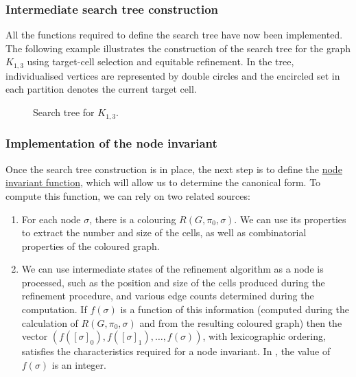 \subsubsection{Intermediate search tree construction}

All the functions required to define the search tree have now been implemented. The following example illustrates the construction of the search tree for the graph $K_{1,3}$ using target-cell selection and equitable refinement. In the tree, individualised vertices are represented by double circles and the encircled set in each partition denotes the current target cell.

\vspace{2em}

\begin{figure}[htbp]
  \centering
  \resizebox{\linewidth}{!}{%
  
  }
  
\caption{Search tree for $K_{1,3}$.}\label{fig:nauty-tree-k13}

\end{figure}


\subsubsection{Implementation of the node invariant}

Once the search tree construction is in place, the next step is to define the \hyperref[def: node variant]{node invariant function}, which will allow us to determine the canonical form. To compute this function, we can rely on two related sources:

\begin{enumerate}
  \item For each node $\sigma$, there is a colouring $R(G,\pi_0, \sigma)$. We can use its properties to extract the number and size of the cells, as well as combinatorial properties of the coloured graph.
  \item We can use intermediate states of the refinement algorithm as a node is processed, such as the position and size of the cells produced during the refinement procedure, and various edge counts determined during the computation. If $f(\sigma)$ is a function of this information (computed during the calculation of $R(G,\pi_0, \sigma)$ and from the resulting coloured graph) then the vector $(f([\sigma]_0), f([\sigma]_1), \ldots, f(\sigma))$, with lexicographic ordering, satisfies the characteristics required for a node invariant. In \Naut, the value of $f(\sigma)$ is an integer.
\end{enumerate}

